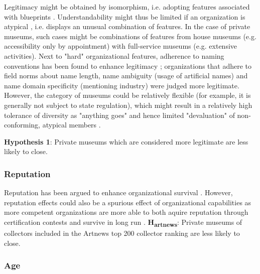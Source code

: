 \documentclass[11pt]{article}
\begin{document}
Legitimacy might be obtained by isomorphism, i.e. adopting features associated with blueprints \parencite{diMaggio_1983_iron}.
Understandability \parencite{Glynn_Abzug_2002_names} might thus be limited if an organization is atypical \parencite{Rosch_1975_family}, i.e. displays an unusual combination of features.
In the case of private museums, such cases might be combinations of features from house museums (e.g. accessibility only by appointment) with full-service museums (e.g. extensive activities). 
Next to "hard" organizational features, adherence to naming conventions has been found to enhance legitimacy \parencite{Glynn_Abzug_2002_names}; organizations that adhere to field norms about name length, name ambiguity (usage of artificial names) and name domain specificity (mentioning industry) were judged more legitimate. 
However, the category of museums could be relatively flexible (for example, it is generally not subject to state regulation), which might result in a relatively high tolerance of diversity as "anything goes" and hence limited "devaluation" of non-conforming, atypical members \parencite{Bogaert_etal_2014_ecological}. 

\bigbreak
\noindent
\textbf{Hypothesis 1}: Private museums which are considered more legitimate are less likely to close. 


\subsubsection*{Reputation}


Reputation has been argued to enhance organizational survival \parencite{Rao_1994_reputation}.
However, reputation effects could also be a spurious effect of organizational capabilities as more competent organizations are more able to both aquire reputation through certification contests and survive in long run \parencite{Goldfarb_Zavyalova_Pillai_2018_Rao}.
\bigbreak
\noindent
\textbf{H\textsubscript{artnews}}: Private museums of collectors included in the Artnews top 200 collector ranking are less likely to close. 



\subsubsection*{Age}
\end{document}
